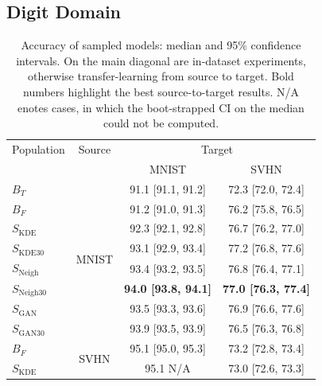 \subsection{Digit Domain}
\begin{table}[ht!]
\begin{minipage}[t]{0.98\textwidth}
\centering
{\small
\caption{Accuracy of sampled models: median and 95\% confidence intervals. On the main diagonal are in-dataset experiments, otherwise transfer-learning from source to target. Bold numbers highlight the best source-to-target results. N/A enotes cases, in which the boot-strapped CI on the median could not be computed.}
\begin{tabularx}{0.6\linewidth}{lccc}
\toprule
Population           & Source                 & \multicolumn{2}{c}{Target}                    \\
\cmidrule(rl){1-1} \cmidrule(rl){2-2}  \cmidrule(rl){3-4} 
                     & \multicolumn{1}{l}{}   & MNIST                 & SVHN                  \\
 \cmidrule(rl){3-3} \cmidrule(rl){4-4}  
$B_T$                & \multirow{8}{*}{MNIST} & 91.1 {[}91.1, 91.2{]} & 72.3 {[}72.0, 72.4{]} \\
\cmidrule(rl){1-1} \cmidrule(rl){2-2}  \cmidrule(rl){3-4} 
$B_F$                &                        & 91.2 {[}91.0, 91.3{]} & 76.2 {[}75.8, 76.5{]} \\
$S_{\text{KDE}}$     &                        & 92.3 {[}92.1, 92.8{]} & 76.7 {[}76.2, 77.0{]} \\
$S_{\text{KDE}30}$   &                        & 93.1 {[}92.9, 93.4{]} & 77.2 {[}76.8, 77.6{]} \\
$S_{\text{Neigh}}$   &                        & 93.4 {[}93.2, 93.5{]} & 76.8 {[}76.4, 77.1{]} \\
$S_{\text{Neigh}30}$ &                        & \textbf{94.0 {[}93.8, 94.1{]}} & \textbf{77.0 {[}76.3, 77.4{]}} \\
$S_{\text{GAN}}$     &                        & 93.5 {[}93.3, 93.6{]} & 76.9 {[}76.6, 77.6{]} \\
$S_{\text{GAN}30}$   &                        & 93.9 {[}93.5, 93.9{]} & 76.5 {[}76.3, 76.8{]} \\
\cmidrule(rl){1-1} \cmidrule(rl){2-2}  \cmidrule(rl){3-4} 
$B_F$                & \multirow{7}{*}{SVHN}  & 95.1 {[}95.0, 95.3{]} & 73.2 {[}72.8, 73.4{]} \\
$S_{\text{KDE}}$     &                        & 95.1 N/A              & 73.0 {[}72.6, 73.3{]} \\

\end{tabularx}}
\end{minipage}
\end{table}

